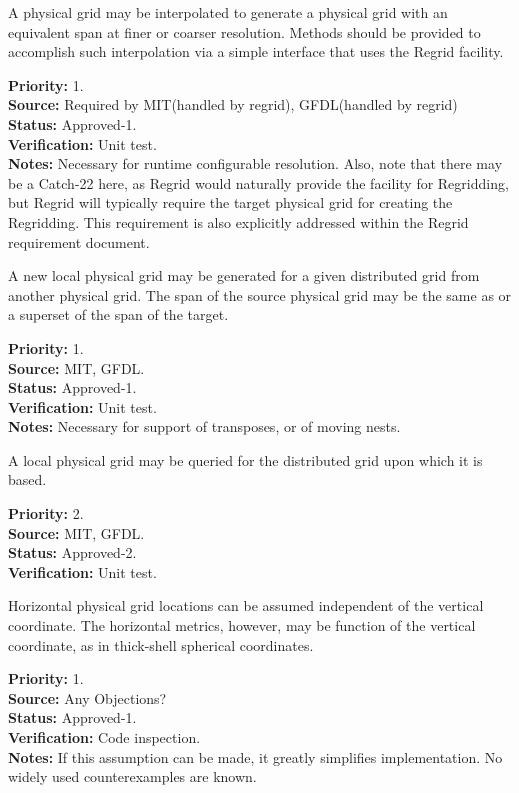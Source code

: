 A physical grid may be interpolated to generate a physical grid with an equivalent span
 at finer or coarser resolution.  Methods should be provided to accomplish such
interpolation via a simple interface that uses the Regrid facility.
\begin{reqlist}
{\bf Priority:} 1. \\
{\bf Source:} Required by MIT(handled by regrid), GFDL(handled by regrid) \\
{\bf Status:} Approved-1. \\
{\bf Verification:} Unit test.\\
{\bf Notes:} Necessary for runtime configurable resolution.  Also, note that 
there may be a Catch-22 here, as Regrid would naturally provide the facility
for Regridding, but Regrid will typically require the target physical grid for
creating the Regridding.  This requirement is also explicitly addressed within the
Regrid requirement document.
\end{reqlist}

A new local physical grid may be generated for a given distributed grid from another 
physical grid.
The span of the source physical grid may be the same as or a superset of
the span of the target.
\begin{reqlist}
{\bf Priority:} 1. \\
{\bf Source:} MIT, GFDL. \\
{\bf Status:} Approved-1. \\
{\bf Verification:} Unit test.\\
{\bf Notes:} Necessary for support of transposes, or of moving nests.
\end{reqlist}

A local physical grid may be queried for the distributed grid upon which it is based.
\begin{reqlist}
{\bf Priority:} 2. \\
{\bf Source:}  MIT, GFDL.\\
{\bf Status:} Approved-2. \\
{\bf Verification:} Unit test. 
\end{reqlist}

Horizontal physical grid locations can be assumed independent of the vertical coordinate.
The horizontal metrics, however, may be function of the vertical coordinate, as
in thick-shell spherical coordinates.
\begin{reqlist}
{\bf Priority:} 1. \\
{\bf Source:} Any Objections? \\
{\bf Status:} Approved-1. \\
{\bf Verification:} Code inspection.\\
{\bf Notes:} If this assumption can be made, it greatly simplifies implementation.
No widely used counterexamples are known.
\end{reqlist}

